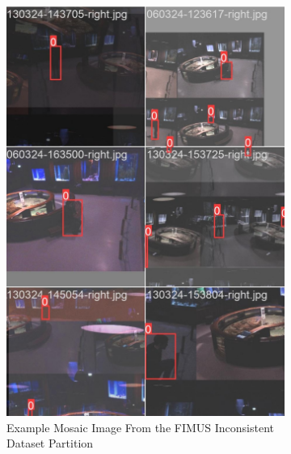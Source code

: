 \begin{figure}[H]
    \centering
    \begin{subfigure}{0.49\textwidth}
        \centering
        \includegraphics[width=\textwidth]{Images/mosaic.jpg}
        \caption{\centering Example Mosaic Image From the FIMUS Inconsistent Dataset Partition}
    \end{subfigure}
    \hfill
    \begin{subfigure}{0.49\textwidth}
        \centering

\end{subfigure}
\end{figure}
